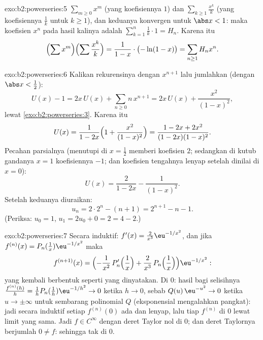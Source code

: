 \begin{solution}{exo:b2:powerseries:5}
 $\sum_{m \geq 0} x^m$ (yang koefisiennya $1$) dan
$\sum_{k\geq1} \frac{x^k}{k}$ (yang koefisiennya $\frac1k$ untuk $k \geq
1$), dan keduanya konvergen  untuk $\abs x < 1$: maka koefisien
$x^n$ pada hasil kalinya adalah $\sum_{k=1}^{n} \frac1k \cdot 1 = H_n$.
Karena itu
\[
\Bigl(\sum x^m\Bigr)\Bigl(\sum \frac{x^k}{k}\Bigr)
= \frac{1}{1-x}\cdot\bigl(-\ln(1-x)\bigr)
= \sum_{n\geq1} H_n x^n .
\]
\end{solution}

\begin{solution}{exo:b2:powerseries:6}
Kalikan rekurensinya dengan $x^{n+1}$ lalu jumlahkan (dengan $\abs x <
\frac12$):
\[
U(x) - 1 = 2x\,U(x) + \sum_{n\geq0} n\,x^{n+1}
= 2x\,U(x) + \frac{x^2}{(1-x)^2} ,
\]
lewat \cref{exo:b2:powerseries:3}. Karena itu
\[
U(x) = \frac{1}{1 - 2x}\Bigl(1 + \frac{x^2}{(1-x)^2}\Bigr)
= \frac{1 - 2x + 2x^2}{(1-2x)(1-x)^2} .
\]
Pecahan parsialnya (menutupi di $x = \frac12$ memberi koefisien $2$;
sedangkan di kutub gandanya $x = 1$ koefisiennya $-1$; dan
koefisien tengahnya lenyap setelah dinilai di $x = 0$):
\[
U(x) = \frac{2}{1-2x} - \frac{1}{(1 - x)^2} .
\]
Setelah keduanya diuraikan:
\[
u_n = 2\cdot 2^n - (n + 1) = 2^{n+1} - n - 1 .
\]
(Periksa: $u_0 = 1$, $u_1 = 2u_0 + 0 = 2 = 4 - 2$.)
\end{solution}

\begin{solution}{exo:b2:powerseries:7}
Secara induktif: $f'(x) = \frac{2}{x^3}\eu^{-1/x^2}$, dan jika $f^{(n)}(x)
= P_n(\tfrac1x)\eu^{-1/x^2}$ maka
\[
f^{(n+1)}(x) =
\Bigl(-\frac{1}{x^2}\,P_n'\Bigl(\frac1x\Bigr) +
\frac{2}{x^3}\,P_n\Bigl(\frac1x\Bigr)\Bigr)\eu^{-1/x^2} :
\]
yang kembali berbentuk seperti yang dinyatakan. Di $0$: hasil bagi selisihnya $\frac{f^{(n)}(h)}{h} =
\frac1h P_n(\frac1h)\eu^{-1/h^2} \to 0$ ketika $h \to 0$, sebab
$Q(u)\,\eu^{-u^2} \to 0$ ketika $u \to \pm\infty$ untuk sembarang polinomial
$Q$ (eksponensial mengalahkan pangkat): jadi secara induktif setiap $f^{(n)}(0)$ ada
dan lenyap, lalu tiap $f^{(n)}$  di $0$ lewat limit yang
sama. Jadi $f \in C^\infty$ dengan deret Taylor nol di $0$; dan
deret Taylornya berjumlah $0 \neq f$: sehingga tak  di $0$.
\end{solution}

